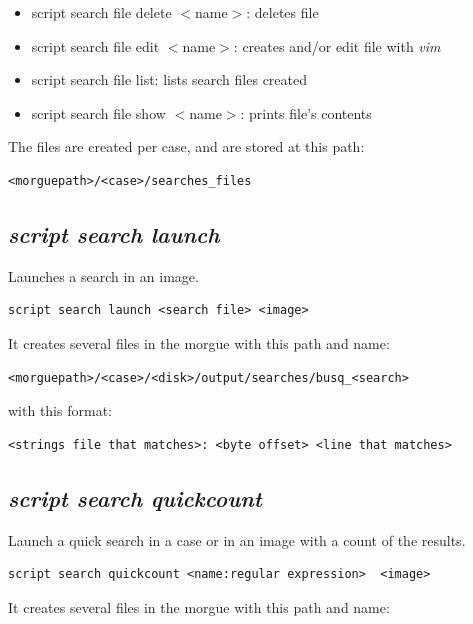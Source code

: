 \documentclass[a4paper,11pt,oneside]{report}
\begin{document}
\begin{itemize}
\item	script search file delete $<$name$>$:  deletes file
\item	script search file edit $<$name$>$:  creates and/or edit file with \emph{vim}
\item	script search file list:  lists search files created
\item	script search file show $<$name$>$:  prints file's contents
\end{itemize}

The files are created per case, and are stored at this path:

\begin{verbatim}
<morguepath>/<case>/searches_files
\end{verbatim}


\subsection{\emph{script search launch}}

Launches a search in an image. 

\begin{verbatim}
script search launch <search file> <image>
\end{verbatim}

It creates several files in the morgue with this path and name:

\begin{verbatim}
<morguepath>/<case>/<disk>/output/searches/busq_<search>
\end{verbatim}

with this format:

\begin{verbatim}
<strings file that matches>: <byte offset> <line that matches>
\end{verbatim}



\subsection{\emph{script search quickcount}}

Launch a quick search in a case or in an image with a count of the results.

\begin{verbatim}
script search quickcount <name:regular expression>  <image>
\end{verbatim}

It creates several files in the morgue with this path and name:
\end{document}
